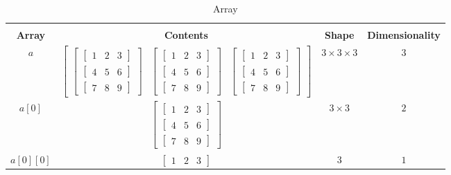\begin{xltabular}{\textwidth}{cccc}\toprule
	\caption{Array} \label{tab:array}\\
	\textbf{Array} & \textbf{Contents} & \textbf{Shape} & \textbf{Dimensionality} \\\midrule \endhead
	$a$ & $
	\begin{bmatrix}
	\begin{bmatrix}
	\begin{bmatrix}
	1 & 2 & 3
	\end{bmatrix}\\
	\begin{bmatrix}
	4 & 5 & 6
	\end{bmatrix}\\
	\begin{bmatrix}
	7 & 8 & 9
	\end{bmatrix}	
	\end{bmatrix} &
	\begin{bmatrix}
	\begin{bmatrix}
	1 & 2 & 3
	\end{bmatrix}\\
	\begin{bmatrix}
	4 & 5 & 6
	\end{bmatrix}\\
	\begin{bmatrix}
	7 & 8 & 9
	\end{bmatrix}	
	\end{bmatrix} &
	\begin{bmatrix}
	\begin{bmatrix}
	1 & 2 & 3
	\end{bmatrix}\\
	\begin{bmatrix}
	4 & 5 & 6
	\end{bmatrix}\\
	\begin{bmatrix}
	7 & 8 & 9
	\end{bmatrix}	
	\end{bmatrix}
	\end{bmatrix}
	$ & $3 \times 3 \times 3$ & $3$\\\midrule
	$a[0]$ & $
	\begin{bmatrix}
	\begin{bmatrix}
	1 & 2 & 3
	\end{bmatrix}\\
	\begin{bmatrix}
	4 & 5 & 6
	\end{bmatrix}\\
	\begin{bmatrix}
	7 & 8 & 9
	\end{bmatrix}	
	\end{bmatrix}
	$ & $3 \times 3$ & $2$\\\midrule
	$a[0][0]$ & $
	\begin{bmatrix}
	1 & 2 & 3
	\end{bmatrix}
	$ & $3$ & $1$
	\\\bottomrule
\end{xltabular}

